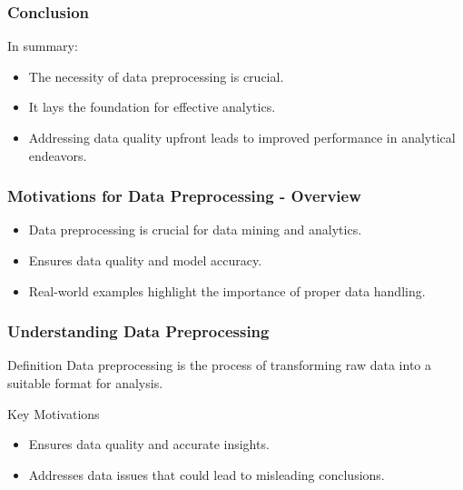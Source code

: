 \documentclass[aspectratio=169]{beamer}
\begin{document}
\begin{frame}[fragile]
    \frametitle{Conclusion}
    In summary:
    \begin{itemize}
        \item The necessity of data preprocessing is crucial.
        \item It lays the foundation for effective analytics.
        \item Addressing data quality upfront leads to improved performance in analytical endeavors.
    \end{itemize}
\end{frame}

\begin{frame}[fragile]
    \frametitle{Motivations for Data Preprocessing - Overview}
    \begin{itemize}
        \item Data preprocessing is crucial for data mining and analytics.
        \item Ensures data quality and model accuracy.
        \item Real-world examples highlight the importance of proper data handling.
    \end{itemize}
\end{frame}

\begin{frame}[fragile]
    \frametitle{Understanding Data Preprocessing}
    \begin{block}{Definition}
        Data preprocessing is the process of transforming raw data into a suitable format for analysis.
    \end{block}
    
    \begin{block}{Key Motivations}
        \begin{itemize}
            \item Ensures data quality and accurate insights.
            \item Addresses data issues that could lead to misleading conclusions.
        \end{itemize}
    \end{block}
\end{frame}
\end{document}
